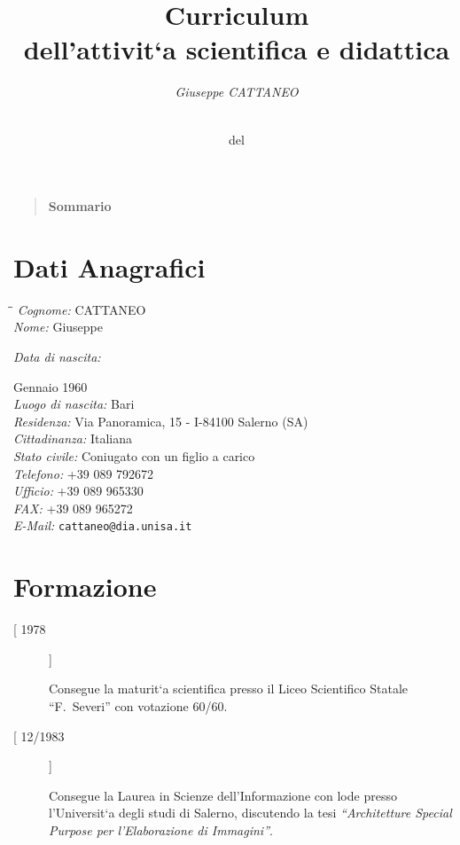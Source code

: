 \documentclass[11pt]{article}
\author{\Large \sl Giuseppe CATTANEO}
\date{\thefileversion \\ del \thefiledate}
\title{{\sffamily\bfseries {\Huge Curriculum\\}   
 {\Large dell'attivit\a`a scientifica e didattica\\}}}
\makeatletter
\def\contentsname{Sommario}
\newlength{\posii}
\newlength{\fineitem}
\newlength{\boxsize}
\def\tableofcontents{%
  \par\vfill
  \begin{quote}
    \begin{center} \huge\bf \contentsname \end{center}
    \def\numberline##1{\hbox to 0pt{\hss##1\hskip 1em}}%
    \let\oldaddvspace\addvspace
    \def\addvspace##1{%
      \myskip##1\relax
      \oldaddvspace{.5\myskip}}
    \@starttoc{toc}%
  \end{quote}
  \thispagestyle{empty}
  \vfill
  \clearpage}
\makeatother
\begin{document}
\maketitle
\newpage
\tableofcontents

%
%

\section{Dati Anagrafici}
\begin{tabbing}
 \makebox[\posii]{}\=\makebox[\boxsize]{}\=\kill
        {\sl Cognome:}\>        CATTANEO\\[\fineitem]
        {\sl Nome:}\>   Giuseppe\\[\fineitem]
        \parbox[t]{\posii}
        {\sl Data di nascita:} Gennaio 1960\\[\fineitem]
        {\sl Luogo di nascita:}\> Bari\\[\fineitem]
        {\sl Residenza:}\> Via Panoramica, 15 -
                           I-84100 Salerno (SA)\\[\fineitem]
        {\sl Cittadinanza:}\> Italiana\\[\fineitem]
        {\sl Stato civile:}\> Coniugato con un figlio a carico\\[\fineitem]
        {\sl Telefono:}\> +39 089 792672\\[\fineitem]
        {\sl Ufficio:}\> +39 089 965330\\[\fineitem]
        {\sl FAX:}\>    +39 089 965272\\[\fineitem]
	{\sl E-Mail:} \> {\tt cattaneo@dia.unisa.it}\\
\end{tabbing}



\section{Formazione}
\begin{description}
\item [[ 1978]]
\hfill \parbox[t]{\boxsize}     { Consegue la maturit\a`a scientifica
presso il Liceo Scientifico Statale ``F.~Severi'' con votazione
60/60.}

\item[[ 12/1983]] \hfill \parbox[t]{\boxsize}{Consegue la Laurea in
Scienze dell'Informazione con lode presso l'Universit\a`a degli studi
di Salerno, discutendo la tesi {\sl ``Architetture Special Purpose per
l'Elaborazione di Immagini\/''}.}
\end{description}
\end{document}
